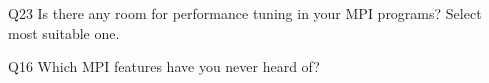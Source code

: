 \begin{description}%
\item{Q23} Is there any room for performance tuning in your MPI programs? Select most suitable one.%
\item{Q16} Which MPI features have you never heard of?%
\end{description}%
